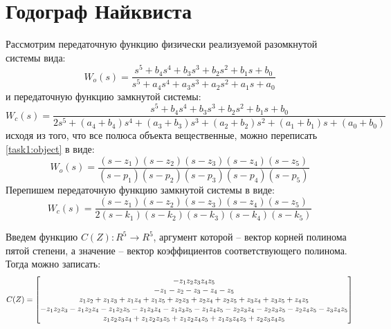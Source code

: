\section{Годограф Найквиста}
Рассмотрим передаточную функцию физически реализуемой разомкнутой системы вида: 
\begin{equation}
    W_o(s) = \frac{s^5 + b_4s^4 + b_3s^3 + b_2s^2 + b_1s + b_0}{s^5 + a_4s^4 + a_3s^3 + a_2s^2 + a_1s + a_0}
    \label{task1:object}
\end{equation}
и передаточную функцию замкнутой системы:
\begin{equation}
    W_c(s) = \frac{s^5 + b_4s^4 + b_3s^3 + b_2s^2 + b_1s + b_0}{2s^5 + (a_4 + b_4)s^4 + (a_3 + b_3)s^3 + (a_2 + b_2)s^2 + (a_1 + b_1)s + (a_0 + b_0)}
\end{equation}
исходя из того, что все полюса объекта вещественные, можно переписать \ref{task1:object} в виде:
\begin{equation}
    W_o(s) = \frac{(s - z_1)(s - z_2)(s - z_3)(s - z_4)(s - z_5)}{(s - p_1)(s - p_2)(s - p_3)(s - p_4)(s - p_5)}
\end{equation}
Перепишем передаточную функцию замкнутой системы в виде:
\begin{equation}
    W_c(s) = \frac{(s - z_1)(s - z_2)(s - z_3)(s - z_4)(s - z_5)}{2(s - k_1)(s - k_2)(s - k_3)(s - k_4)(s - k_5)}
\end{equation}

Введем функцию $C(Z):R^5\rightarrow R^5$, аргумент которой -- вектор корней полинома пятой степени, а значение -- вектор коэффициентов соответствующего полинома. Тогда можно записать:
\begin{equation}
    C(Z) = \begin{bmatrix}
        -z_1z_2z_3z_4z_5 \\ 
        -z_1 - z_2 - z_3 - z_4 - z_5 \\
        z_1z_2 + z_1z_3 + z_1z_4 + z_1z_5 + z_2z_3 + z_2z_4 + z_2z_5 + z_3z_4 + z_3z_5 + z_4z_5 \\
        -z_1z_2z_3 - z_1z_2z_4 - z_1z_2z_5 - z_1z_3z_4 - z_1z_3z_5 - z_1z_4z_5 - z_2z_3z_4 - z_2z_3z_5 - z_2z_4z_5 - z_3z_4z_5 \\
        z_1z_2z_3z_4 + z_1z_2z_3z_5 + z_1z_2z_4z_5 + z_1z_3z_4z_5 + z_2z_3z_4z_5 \\
    \end{bmatrix}
    \notag
\end{equation}

